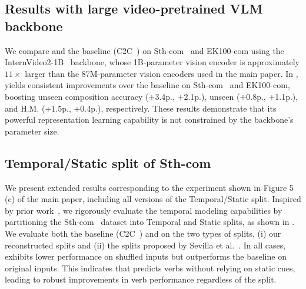 \subsection{Results with large video-pretrained VLM backbone}
\label{sec:iv2_1b_results}


We compare \ours{} and the baseline (C2C~\cite{li2024c2c}) on Sth-com~\cite{li2024c2c} and EK100-com using the InternVideo2-1B~\cite{wang2024iv2} backbone, whose 1B-parameter vision encoder is approximately $11\times$ larger than the 87M-parameter vision encoders used in the main paper.
In , \ours{} yields consistent improvements over the baseline on Sth-com~\cite{li2024c2c} and EK100-com, boosting unseen composition accuracy (+3.4p., +2.1p.), unseen \cg{} (+0.8p., +1.1p.), and H.M. (+1.5p., +0.4p.), respectively.
These results demonstrate that its powerful representation learning capability is not constrained by the backbone's parameter size.


\subsection{Temporal/Static split of Sth-com}
We present extended results corresponding to the experiment shown in Figure 5 (c) of the main paper, including all versions of the Temporal/Static split. 
Inspired by prior work~\cite{laura2021temporal, yun2022time}, we rigorously evaluate the temporal modeling capabilities by partitioning the Sth-com~\cite{li2024c2c} dataset into Temporal and Static splits, as shown in .
We evaluate both the baseline (C2C~\cite{li2024c2c}) and \ours{} on the two types of splits, (i) our reconstructed splits and (ii) the splits proposed by Sevilla et al.~\cite{laura2021temporal}.
In all cases, \ours{} exhibits lower performance on shuffled inputs but outperforms the baseline on original inputs. 
This indicates that \ours{} predicts verbs without relying on static cues, leading to robust improvements in verb performance regardless of the split.

